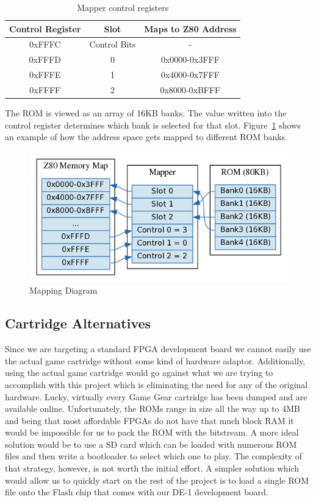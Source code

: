 \documentclass{article}
\begin{document}
\begin{table}[H]
    \centering
    \begin{tabular}{|c|c|c|}
        \hline
        \textbf{Control Register} & \textbf{Slot}     & \textbf{Maps to Z80 Address} \\ \hline
        0xFFFC           & Control Bits & -              \\ \hline
        0xFFFD           & 0            & 0x0000-0x3FFF  \\ \hline
        0xFFFE           & 1            & 0x4000-0x7FFF  \\ \hline
        0xFFFF           & 2            & 0x8000-0xBFFF  \\
        \hline
    \end{tabular}
    \caption{Mapper control registers \protect\cite{mapper}}
\end{table}
The ROM is viewed as an array of 16KB banks. The value written into 
the control register determines which bank is selected for 
that slot. Figure~\ref{fig:mapping_diagram} shows an example of
how the address space gets mapped to different ROM banks.
\begin{figure}[H]
\centering
\includegraphics[scale=0.4]{mapper.png}
\caption{Mapping Diagram}
\label{fig:mapping_diagram}
\end{figure}

\subsection{Cartridge Alternatives}
Since we are targeting a standard FPGA development board we cannot
easily use the actual game cartridge without some kind of hardware adaptor.
Additionally, using the actual game cartridge would go
against what we are trying to accomplish with this project which is
eliminating the need for any of the original hardware. Lucky, virtually
every Game Gear cartridge has been dumped and are available online.
Unfortunately, the ROMs range in size all the way up to 4MB and being that
most affordable FPGAs do not have that much block RAM it would be
impossible for us to pack the ROM with the bitstream. A more ideal
solution would be to use a SD card which can be loaded with numerous
ROM files and then write a bootloader to select which one to play.
The complexity of that strategy, however, is not worth the initial
effort. A simpler solution which would allow us to quickly start on the
rest of the project is to load a single ROM file onto the Flash chip
that comes with our DE-1 development board.
\end{document}
